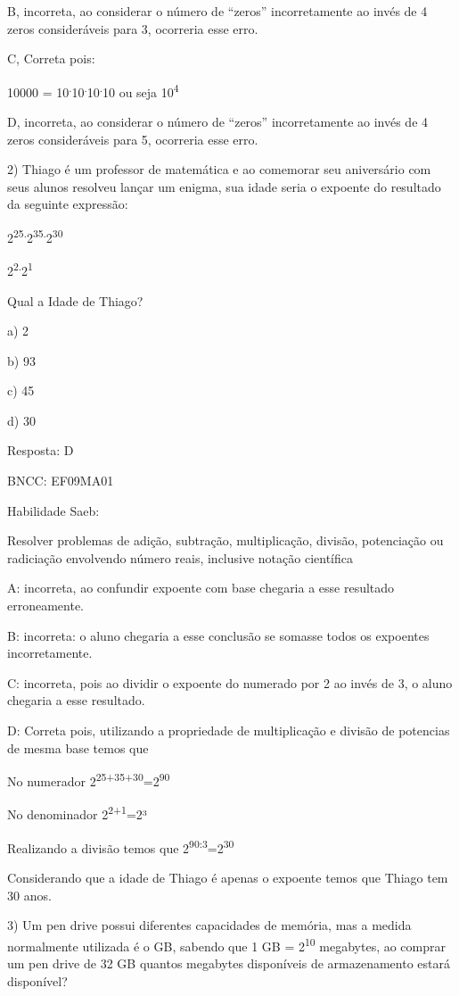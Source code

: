 B, incorreta, ao considerar o número de ``zeros'' incorretamente ao
invés de 4 zeros consideráveis para 3, ocorreria esse erro.

C, Correta pois:

10000 =
10\textsuperscript{.}10\textsuperscript{.}10\textsuperscript{.}10 ou
seja 10\textsuperscript{4}

D, incorreta, ao considerar o número de ``zeros'' incorretamente ao
invés de 4 zeros consideráveis para 5, ocorreria esse erro.

2) Thiago é um professor de matemática e ao comemorar seu aniversário
com seus alunos resolveu lançar um enigma, sua idade seria o expoente do
resultado da seguinte expressão:

2\textsuperscript{25.}2\textsuperscript{35.}2\textsuperscript{30}

2\textsuperscript{2.}2\textsuperscript{1}

Qual a Idade de Thiago?

a) 2

b) 93

c) 45

d) 30

Resposta: D

BNCC: EF09MA01

Habilidade Saeb:

Resolver problemas de adição, subtração, multiplicação, divisão,
potenciação ou radiciação envolvendo número reais, inclusive notação
científica

A: incorreta, ao confundir expoente com base chegaria a esse resultado
erroneamente.

B: incorreta: o aluno chegaria a esse conclusão se somasse todos os
expoentes incorretamente.

C: incorreta, pois ao dividir o expoente do numerado por 2 ao invés de
3, o aluno chegaria a esse resultado.

D: Correta pois, utilizando a propriedade de multiplicação e divisão de
potencias de mesma base temos que

No numerador 2\textsuperscript{25+35+30}=2\textsuperscript{90}

No denominador 2\textsuperscript{2+1}=2³

Realizando a divisão temos que
2\textsuperscript{90:3}=2\textsuperscript{30}

Considerando que a idade de Thiago é apenas o expoente temos que Thiago
tem 30 anos.

3) Um pen drive possui diferentes capacidades de memória, mas a medida
normalmente utilizada é o GB, sabendo que 1 GB = 2\textsuperscript{10}
megabytes, ao comprar um pen drive de 32 GB quantos megabytes
disponíveis de armazenamento estará disponível?

